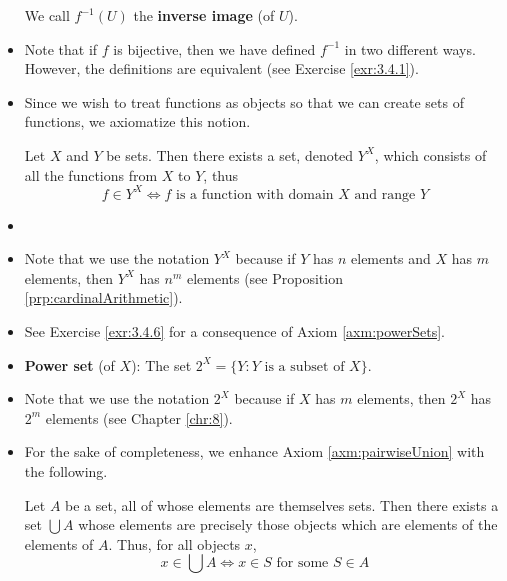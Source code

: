 \documentclass[../main.tex]{subfiles}
\begin{document}
\begin{itemize}
\begin{dfn}
        We call $f^{-1}(U)$ the \textbf{inverse image} (of $U$).
    \end{dfn}
    \item Note that if $f$ is bijective, then we have defined $f^{-1}$ in two different ways. However, the definitions are equivalent (see Exercise \ref{exr:3.4.1}).
    \item Since we wish to treat functions as objects so that we can create sets of functions, we axiomatize this notion.
    \begin{axm}\label{axm:powerSets}
        Let $X$ and $Y$ be sets. Then there exists a set, denoted $Y^X$, which consists of all the functions from $X$ to $Y$, thus
        \begin{equation*}
            f\in Y^X \Longleftrightarrow f\text{ is a function with domain }X\text{ and range }Y
        \end{equation*}
    \end{axm}
    \item {}
    \item Note that we use the notation $Y^X$ because if $Y$ has $n$ elements and $X$ has $m$ elements, then $Y^X$ has $n^m$ elements (see Proposition \ref{prp:cardinalArithmetic}).
    \item See Exercise \ref{exr:3.4.6} for a consequence of Axiom \ref{axm:powerSets}.
    \item \textbf{Power set} (of $X$): The set $2^X=\{Y:Y\text{ is a subset of }X\}$.
    \item Note that we use the notation $2^X$ because if $X$ has $m$ elements, then $2^X$ has $2^m$ elements (see Chapter \ref{chr:8}).
    \item For the sake of completeness, we enhance Axiom \ref{axm:pairwiseUnion} with the following.
    \begin{axm}[Union]\label{axm:union}
        Let $A$ be a set, all of whose elements are themselves sets. Then there exists a set $\bigcup A$ whose elements are precisely those objects which are elements of the elements of $A$. Thus, for all objects $x$,
        \begin{equation*}
            x\in\bigcup A \Longleftrightarrow x\in S\text{ for some }S\in A
        \end{equation*}

\end{axm}
\end{itemize}
\end{document}

